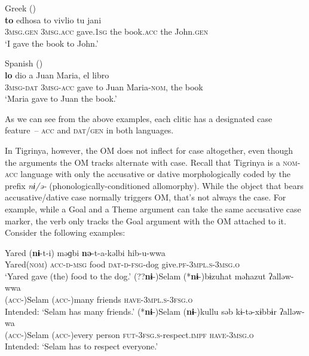 \documentclass[output=paper]{langscibook}
\begin{document}
\ea
\ea Greek (\citealt{ana17})\\
 {\textbf{to}} edhosa to vivlio tu jani \\
{\scshape 3msg.gen} {\scshape 3msg.acc} gave.{\scshape 1sg} the book.{\scshape acc} the John.{\scshape gen}\\
\glt `I gave the book to John.' 

\ex Spanish (\citealt{romero10})\\
 {\textbf{lo}} dio a Juan Maria, el libro\\
{\scshape 3msg-dat} {\scshape 3msg-acc} gave to Juan Maria-{\scshape nom}, the book\\
\glt `Maria gave to Juan the book.' 
\z
\z

\noindent As we can see from the above examples, each clitic has a designated case feature~-- {\scshape acc} and {\scshape dat/gen} in both languages.

In Tigrinya, however, the OM does not inflect for case altogether, even though the arguments the OM tracks alternate with case. Recall that Tigrinya is a {\scshape nom-acc} language with only the accusative or dative morphologically coded by the prefix \textit{nɨ/ǝ-} (phonologically-conditioned allomorphy). While the object that bears accusative/dative case normally triggers OM, that's not always the case. For example, while a Goal and a Theme argument can take the same accusative case marker, the verb only tracks the Goal argument with the OM attached to it. Consider the following examples: 


\ea\label{ex:Gebregziabher:theme}
\ea\label{ex:Gebregziabher:acc} 
\gll Yared ({\textbf{nɨ}}-t-i) məɡbi {\textbf{nə}}-t-a-kəlbi hib-u-wwa \\ 
Yared({\scshape nom}) {\scshape acc-d-msg} food {\scshape dat-d-fsg}-dog  give.{\scshape pf-3mpl.s-3msg.o} \\
\glt `Yared gave (the) food to the dog.'
\ex\label{ex:Gebregziabher:goal1} 
\gll (??{\textbf{nɨ}}-)Selam (*{\textbf{nɨ}}-)bɨzuħat məħazut  ʔalləw-wwa \\ 
({\scshape acc}-)Selam ({\scshape acc}-)many friends  {\scshape have-3mpl.s-3fsg.o} \\
\glt Intended: `Selam has many friends.'
\ex\label{ex:Gebregziabher:goal2} 
\gll (*{\textbf{nɨ}}-)Selam ({\textbf{nɨ}}-)kullu səb kɨ-tə-xɨbbɨr ʔalləw-wa \\ 
({\scshape acc}-)Selam ({\scshape acc}-)every person {\scshape fut-3fsg.s}-respect.{\scshape impf} {\scshape have-3msg.o} \\
\glt Intended: `Selam has to respect everyone.'
\z
\z
\end{document}
